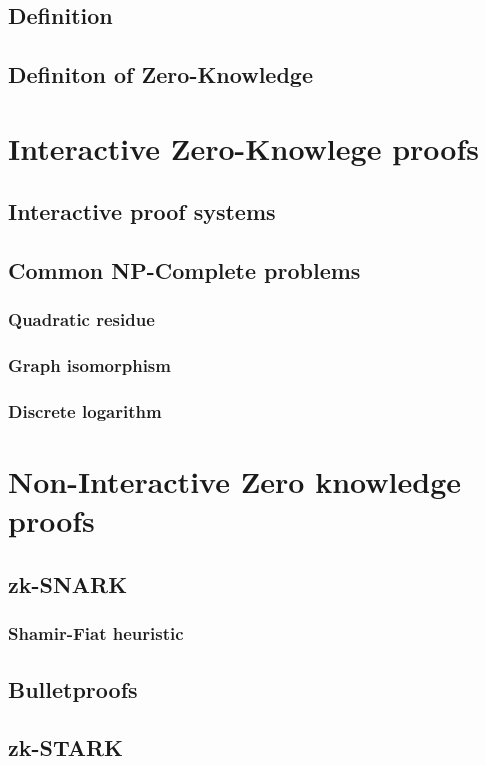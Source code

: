 \documentclass[12pt,a4paper]{article}
\begin{document}
\subsection{Definition}
\subsection{Definiton of Zero-Knowledge}
\section{Interactive Zero-Knowlege proofs}
\subsection{Interactive proof systems}
\subsection{Common NP-Complete problems}
\subsubsection{Quadratic residue}
\subsubsection{Graph isomorphism}
\subsubsection{Discrete logarithm}
\section{Non-Interactive Zero knowledge proofs}
\subsection{zk-SNARK} 
\subsubsection{Shamir-Fiat heuristic}
\subsection{Bulletproofs}
\subsection{zk-STARK}

\printbibliography
\end{document}
